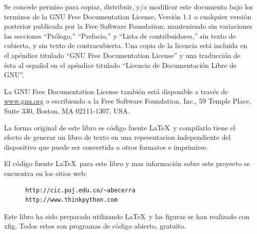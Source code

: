 \documentclass[letterpaper,twoside,10pt]{book}
\begin{document}
Se concede permiso para copiar, distribuir, y/o modificar este documento bajo
los terminos de la GNU Free Documentation License, Versión 1.1 o cualquier
versión posterior publicada por la Free Software Foundation; manteniendo 
sin variaciones las secciones ``Prólogo,'' ``Prefacio,'' y ``Lista de contribuidores,''
sin texto de cubierta, y sin texto de contracubierta. Una copia de la licencia
está incluida en el apéndice titulado ``GNU Free Documentation License'' y una 
traducción de ésta al español en el apéndice titulado ``Licencia de Documentación Libre de GNU''.

La GNU Free Documentation License también está disponible a través de \url{www.gnu.org}
o escribiendo a la Free Software Foundation, Inc., 59 Temple Place,
Suite 330, Boston, MA 02111-1307, USA.

La forma original de este libro es código fuente \LaTeX\  y compilarlo
tiene el efecto de generar un libro de texto en una 
repesentacion independiente del dispositivo que puede ser convertida a otros 
formatos e imprimirse.

El código  fuente \LaTeX\  para este libro y mas información sobre este proyecto
se encuentra en los sitios web:

\begin{verbatim}
      http://cic.puj.edu.co/~abecerra
      http://www.thinkpython.com
\end{verbatim}

Este libro ha sido preparado utilizando \LaTeX\ y las figuras
se han realizado con xfig.  Todos estos son programas de código
abierto, gratuito.

\vspace{0.25in}
\newpage
\thispagestyle{empty}
\end{document}
